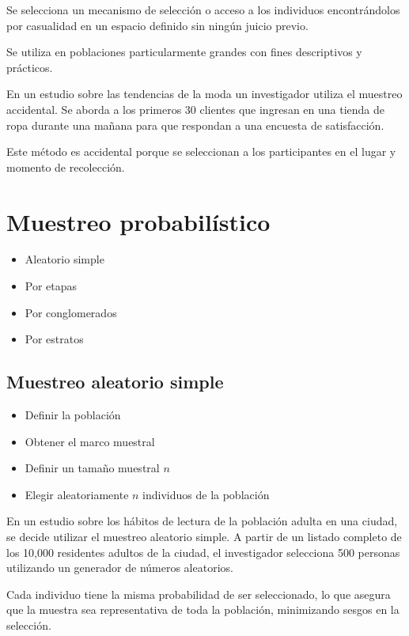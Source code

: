\documentclass[
  letterpaper,
  DIV=11,
  numbers=noendperiod]{scrreprt}
\providecommand{\tightlist}{%
  \setlength{\itemsep}{0pt}\setlength{\parskip}{0pt}}\usepackage{longtable,booktabs,array}
\begin{document}
Se selecciona un mecanismo de selección o acceso a los individuos
encontrándolos por casualidad en un espacio definido sin ningún juicio
previo.

Se utiliza en poblaciones particularmente grandes con fines descriptivos
y prácticos.

En un estudio sobre las tendencias de la moda un investigador utiliza el
muestreo accidental. Se aborda a los primeros 30 clientes que ingresan
en una tienda de ropa durante una mañana para que respondan a una
encuesta de satisfacción.

Este método es accidental porque se seleccionan a los participantes en
el lugar y momento de recolección.

\chapter{Muestreo probabilístico}\label{muestreo-probabiluxedstico-1}

\begin{itemize}
\item
  Aleatorio simple
\item
  Por etapas
\item
  Por conglomerados
\item
  Por estratos
\end{itemize}

\section{Muestreo aleatorio simple}\label{muestreo-aleatorio-simple}

\begin{itemize}
\tightlist
\item
  Definir la población
\item
  Obtener el marco muestral
\item
  Definir un tamaño muestral \(n\)
\item
  Elegir aleatoriamente \(n\) individuos de la población
\end{itemize}

En un estudio sobre los hábitos de lectura de la población adulta en una
ciudad, se decide utilizar el muestreo aleatorio simple. A partir de un
listado completo de los 10,000 residentes adultos de la ciudad, el
investigador selecciona 500 personas utilizando un generador de números
aleatorios.

Cada individuo tiene la misma probabilidad de ser seleccionado, lo que
asegura que la muestra sea representativa de toda la población,
minimizando sesgos en la selección.
\end{document}
